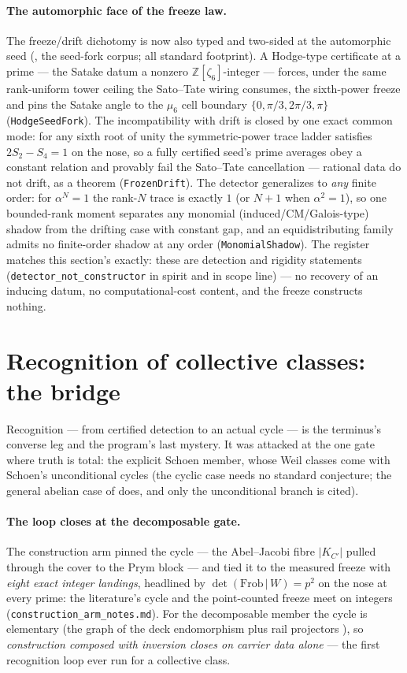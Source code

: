 \documentclass[11pt]{article}
\theoremstyle{definition}
\theoremstyle{remark}
\begin{document}
\paragraph{The automorphic face of the freeze law.} The freeze/drift
dichotomy is now also typed and two-sided at the automorphic seed
(\cite{Universal}, the seed-fork corpus; all standard footprint).  A
Hodge-type certificate at a prime --- the Satake datum a nonzero
$\mathbb Z[\zeta_6]$-integer --- forces, under the same rank-uniform tower
ceiling the Sato--Tate wiring consumes, the sixth-power freeze and pins the
Satake angle to the $\mu_6$ cell boundary $\{0,\pi/3,2\pi/3,\pi\}$
(\texttt{HodgeSeedFork}).  The incompatibility with drift is closed by one
exact common mode: for any sixth root of unity the symmetric-power trace
ladder satisfies $2S_2-S_4=1$ on the nose, so a fully certified seed's prime
averages obey a constant relation and provably fail the Sato--Tate
cancellation --- rational data do not drift, as a theorem
(\texttt{FrozenDrift}).  The detector generalizes to \emph{any} finite order:
for $\alpha^N=1$ the rank-$N$ trace is exactly $1$ (or $N{+}1$ when
$\alpha^2=1$), so one bounded-rank moment separates any monomial
(induced/CM/Galois-type) shadow from the drifting case with constant gap,
and an equidistributing family admits no finite-order shadow at any order
(\texttt{MonomialShadow}).  The register matches this section's exactly:
these are detection and rigidity statements
(\texttt{detector\_not\_constructor} in spirit and in scope line) --- no
recovery of an inducing datum, no computational-cost content, and the freeze
constructs nothing.

\section{Recognition of collective classes: the bridge}\label{sec:bridge}

Recognition --- from certified detection to an actual cycle --- is the
terminus's converse leg and the program's last mystery. It was attacked at
the one gate where truth is total: the explicit Schoen member, whose Weil
classes come with Schoen's unconditional cycles \cite{Schoen88,Schoen98}
(the cyclic case needs no standard conjecture; the general abelian case of
\cite{PatelZhang} does, and only the unconditional branch is cited).

\paragraph{The loop closes at the decomposable gate.} The construction arm
pinned the cycle --- the Abel--Jacobi fibre $|K_{C'}|$ pulled through the
cover to the Prym block --- and tied it to the measured freeze with
\emph{eight exact integer landings}, headlined by
$\det(\mathrm{Frob}\,|\,W)=p^2$ on the nose at every prime: the
literature's cycle and the point-counted freeze meet on integers
(\texttt{construction\_arm\_notes.md}). For the decomposable member the
cycle is elementary (the graph of the deck endomorphism plus rail
projectors \cite{vanGeemenNotes}), so \emph{construction composed with
inversion closes on carrier data alone} --- the first recognition loop ever
run for a collective class.
\end{document}
